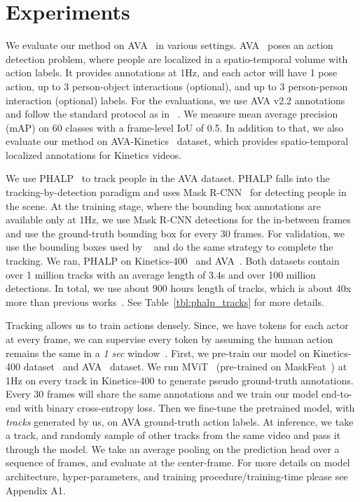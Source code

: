 \section{Experiments}
\label{sec:experiments}

We evaluate our method on AVA~\cite{gu2018ava} in various settings. AVA~\cite{gu2018ava} poses an action detection problem, where people are localized in a spatio-temporal volume with action labels. It provides annotations at 1Hz, and each actor will have 1 pose action, up to 3 person-object interactions (optional), and up to 3 person-person interaction (optional) labels. For the evaluations, we use AVA v2.2 annotations and follow the standard protocol as in ~\cite{gu2018ava}. We measure mean average precision (mAP) on 60 classes with a frame-level IoU of 0.5. In addition to that, we also evaluate our method on AVA-Kinetics~\cite{li2020ava} dataset, which provides spatio-temporal localized annotations for Kinetics videos.

We use PHALP~\cite{rajasegaran2022tracking} to track people in the AVA dataset. PHALP falls into the tracking-by-detection paradigm and uses Mask R-CNN~\cite{he2017mask} for detecting people in the scene. At the training stage, where the bounding box annotations are available only at 1Hz, we use Mask R-CNN detections for the in-between frames and use the ground-truth bounding box for every 30 frames. For validation, we use the bounding boxes used by ~\cite{pan2021actor} and do the same strategy to complete the tracking. We ran, PHALP on Kinetics-400~\cite{kay2017kinetics} and AVA~\cite{gu2018ava}. Both datasets contain over 1 million tracks with an average length of 3.4s and over 100 million detections. In total, we use about 900 hours length of tracks, which is about 40x more than previous works~\cite{kanazawa2019learning}. See Table~\ref{tbl:phalp_tracks} for more details. 

Tracking allows us to train actions densely. Since, we have tokens for each actor at every frame, we can supervise every token by assuming the human action remains the same in a \textit{1 sec} window~\cite{gu2018ava}. First, we pre-train our model on Kinetics-400 dataset~\cite{kay2017kinetics} and AVA~\cite{gu2018ava} dataset. We run MViT~\cite{fan2021multiscale} (pre-trained on MaskFeat~\cite{wei2022masked}) at 1Hz on every track in Kinetics-400 to generate pseudo ground-truth annotations. Every 30 frames will share the same annotations and we train our model end-to-end with binary cross-entropy loss. Then we fine-tune the pretrained model, with \textit{tracks} generated by us, on AVA ground-truth action labels. At inference, we take a track, and randomly sample  of other tracks from the same video and pass it through the model. We take an average pooling on the prediction head over a sequence of  frames, and evaluate at the center-frame. For more details on model architecture, hyper-parameters, and training procedure/training-time please see Appendix A1.

